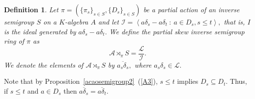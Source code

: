 \documentclass[11pt, a4paper]{amsart}
\newcommand{\Skew}{\ensuremath {\mathcal{A} \rtimes_\pi S}}
\theoremstyle{plain}
\newtheorem{definition}[theorem]{Definition}
\begin{document}

\begin{definition} Let $\pi = ( \{\pi_s\}_{s \in S}, \{D_s\}_{s \in S})$ be a partial action of an inverse semigroup $S$ on a $K$-algebra $A$ and let $\mathcal{I} =  \left\langle  a\delta_s-a\delta_t \ : \ a \in D_s,  s \leq t \right\rangle,$ that is, $I$ is the ideal generated by $a\delta_s-a\delta_t.$  We define the \emph{partial skew inverse semigroup ring} of $\pi$ as 
 $$\Skew = \dfrac{\mathcal{L}}{\mathcal{I}}.$$
We denote the elements of $\Skew$ by $\overline{a_s\delta_s},$ where  $a_s\delta_s \in \mathcal{L}.$
\end{definition}

Note that by Proposition~\ref{acaosemigroup2}~(\ref{A3}), $s \leq t$ implies $D_s \subseteq D_t.$ Thus, if $s \leq t$ and $a \in D_s$ then $\overline{a\delta_s}= \overline{a\delta_t}.$





\end{document}

